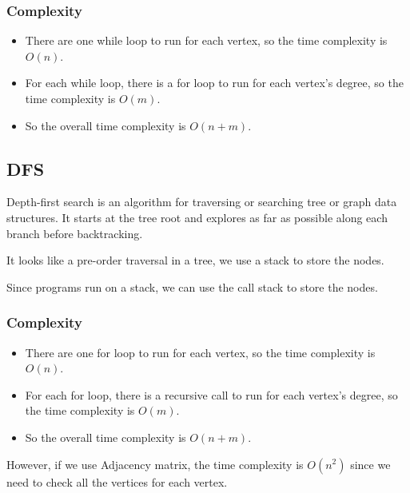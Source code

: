 \documentclass[letterpaper,12pt]{article}
\begin{document}
\subsubsection{Complexity}
\begin{itemize}
    \item There are one while loop to run for each vertex, so the time complexity is $O(n)$.
    \item For each while loop, there is a for loop to run for each vertex's degree, so the time complexity is $O(m)$.
    \item So the overall time complexity is $O(n+m)$.
\end{itemize}
\subsection{DFS}
Depth-first search is an algorithm for traversing or searching tree or graph data structures. It starts at the tree root and explores as far as possible along each branch before backtracking.

It looks like a pre-order traversal in a tree, we use a stack to store the nodes.

Since programs run on a stack, we can use the call stack to store the nodes.
\begin{algorithmic}
    \Else 
    \EndIf
\EndFor
\end{algorithmic}
\subsubsection{Complexity}
\begin{itemize}
    \item There are one for loop to run for each vertex, so the time complexity is $O(n)$.
    \item For each for loop, there is a recursive call to run for each vertex's degree, so the time complexity is $O(m)$.
    \item So the overall time complexity is $O(n+m)$.
\end{itemize}

However, if we use Adjacency matrix, the time complexity is $O(n^2)$ since we need to check all the vertices for each vertex.
\end{document}

